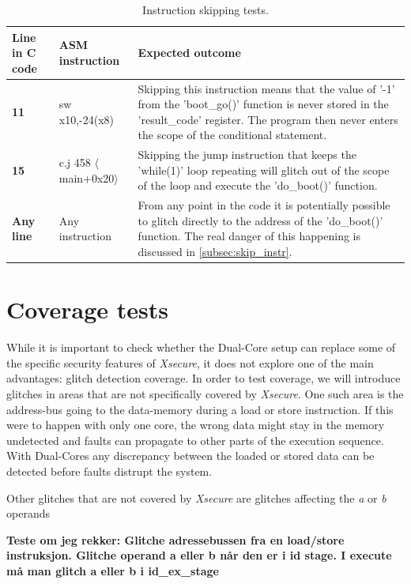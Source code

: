 \begin{table}[h]
\centering
\caption{Instruction skipping tests.}
\label{tab:instr_skip_test}
\begin{tabular}{m{2.5cm}m{3.5cm}m{7.5cm}}
\toprule 
Line in C code & ASM instruction & Expected outcome \\
\midrule
\rowcolor{black!20} \textbf{11} & sw x10,-24(x8) & Skipping this instruction means that the value of '-1' from the 'boot\_go()' function is never stored in the 'result\_code' register. The program then never enters the scope of the conditional statement. \\
\textbf{15} & c.j 458 $\langle$main+0x20$\rangle$ & Skipping the jump instruction that keeps the 'while(1)' loop repeating will glitch out of the scope of the loop and execute the 'do\_boot()' function.  \\
\rowcolor{black!20} \textbf{Any line} & Any instruction & From any point in the code it is potentially possible to glitch directly to the address of the 'do\_boot()' function. The real danger of this happening is discussed in \autoref{subsec:skip_instr}. \\
\bottomrule
\end{tabular}
\end{table}

\section{Coverage tests}
\label{sec:coverage_test}

While it is important to check whether the Dual-Core setup can replace some of the specific security features of \textit{Xsecure}, it does not explore one of the main advantages: glitch detection coverage. In order to test coverage, we will introduce glitches in areas that are not specifically covered by \textit{Xsecure}. One such area is the address-bus going to the data-memory during a load or store instruction. If this were to happen with only one core, the wrong data might stay in the memory undetected and faults can propagate to other parts of the execution sequence. With Dual-Cores any discrepancy between the loaded or stored data can be detected before faults distrupt the system. 

Other glitches that are not covered by \textit{Xsecure} are glitches affecting the \textit{a} or \textit{b} operands 

\textbf{Teste om jeg rekker: Glitche adressebussen fra en load/store instruksjon. Glitche operand a eller b når den er i id stage. I execute må man glitch a eller b i id\_ex\_stage}

